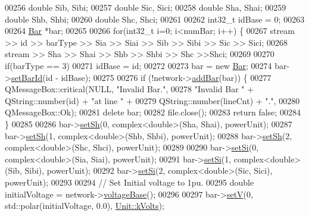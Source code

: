 \begin{DoxyCode}
00256   \textcolor{keywordtype}{double} Sib, Sibi;
00257   \textcolor{keywordtype}{double} Sic, Sici;
00258   \textcolor{keywordtype}{double} Sha, Shai;
00259   \textcolor{keywordtype}{double} Shb, Shbi;
00260   \textcolor{keywordtype}{double} Shc, Shci;
00261 
00262   int32\_t idBase = 0;
00263 
00264   \hyperlink{class_bar}{Bar} *bar;
00265 
00266   \textcolor{keywordflow}{for}(int32\_t i=0; i<numBar; i++) \{
00267     stream >> \textcolor{keywordtype}{id} >> barType >> Sia >> Siai >> Sib >> Sibi >> Sic >> Sici;
00268     stream >> Sha >> Shai >> Shb >> Shbi >> Shc >>Shci;
00269 
00270     \textcolor{keywordflow}{if}(barType == 3)
00271       idBase = id;
00272 
00273     bar = \textcolor{keyword}{new} \hyperlink{class_bar}{Bar};
00274     bar->\hyperlink{group___models_gae3cf341a76cc4589fe3203d0a3ed2ac0}{setBarId}(\textcolor{keywordtype}{id} - idBase);
00275 
00276     \textcolor{keywordflow}{if} (!network->\hyperlink{group___models_ga8c5dfef0216731246f7411e1a5fbee01}{addBar}(bar)) \{
00277       QMessageBox::critical(NULL, \textcolor{stringliteral}{"Invalid Bar."},
00278                             \textcolor{stringliteral}{"Invalid Bar "} + QString::number(\textcolor{keywordtype}{id}) + \textcolor{stringliteral}{"at line "} +
00279                             QString::number(lineCnt) + \textcolor{stringliteral}{"."},
00280                             QMessageBox::Ok);
00281       \textcolor{keyword}{delete} bar;
00282       file.close();
00283       \textcolor{keywordflow}{return} \textcolor{keyword}{false};
00284     \}
00285 
00286     bar->\hyperlink{group___models_gafd91c7f15566b9d5a68a197efeaeaf26}{setSh}(0, complex<double>(Sha, Shai), powerUnit);
00287     bar->\hyperlink{group___models_gafd91c7f15566b9d5a68a197efeaeaf26}{setSh}(1, complex<double>(Shb, Shbi), powerUnit);
00288     bar->\hyperlink{group___models_gafd91c7f15566b9d5a68a197efeaeaf26}{setSh}(2, complex<double>(Shc, Shci), powerUnit);
00289 
00290     bar->\hyperlink{group___models_ga85e2a9b8a281900333fd65d1b532acfd}{setSi}(0, complex<double>(Sia, Siai), powerUnit);
00291     bar->\hyperlink{group___models_ga85e2a9b8a281900333fd65d1b532acfd}{setSi}(1, complex<double>(Sib, Sibi), powerUnit);
00292     bar->\hyperlink{group___models_ga85e2a9b8a281900333fd65d1b532acfd}{setSi}(2, complex<double>(Sic, Sici), powerUnit);
00293 
00294     \textcolor{comment}{// Set Initial voltage to 1pu.}
00295     \textcolor{keywordtype}{double} initialVoltage = network->\hyperlink{group___models_ga88cd2506aaf0b19513e41f00608093e0}{voltageBase}();
00296 
00297     bar->\hyperlink{group___models_ga8d1e70b2d11ed4245e81b8b20858079d}{setV}(0, std::polar(initialVoltage, 0.0), \hyperlink{class_unit_a55b07dfa9457e1eca2c7194fe0cfc3c1aa54b2473993a702a3923525765bd6e4c}{Unit::kVolts});

\end{DoxyCode}
